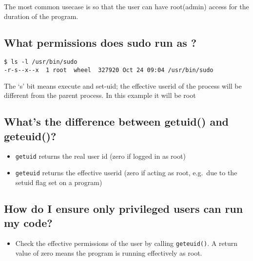The most common usecase is so that the user can have root(admin) access
for the duration of the program.

\subsection{What permissions does sudo run as
?}\label{what-permissions-does-sudo-run-as}

\begin{verbatim}
$ ls -l /usr/bin/sudo
-r-s--x--x  1 root  wheel  327920 Oct 24 09:04 /usr/bin/sudo
\end{verbatim}

The `s' bit means execute and set-uid; the effective userid of the
process will be different from the parent process. In this example it
will be root

\subsection{What's the difference between getuid() and
geteuid()?}\label{whats-the-difference-between-getuid-and-geteuid}

\begin{itemize}
\itemsep1pt\parskip0pt
\item
  \texttt{getuid} returns the real user id (zero if logged in as root)
\item
  \texttt{geteuid} returns the effective userid (zero if acting as root,
  e.g.~due to the setuid flag set on a program)
\end{itemize}

\subsection{How do I ensure only privileged users can run my
code?}\label{how-do-i-ensure-only-privileged-users-can-run-my-code}

\begin{itemize}
\itemsep1pt\parskip0pt
\item
  Check the effective permissions of the user by calling
  \texttt{geteuid()}. A return value of zero means the program is
  running effectively as root.
\end{itemize}
